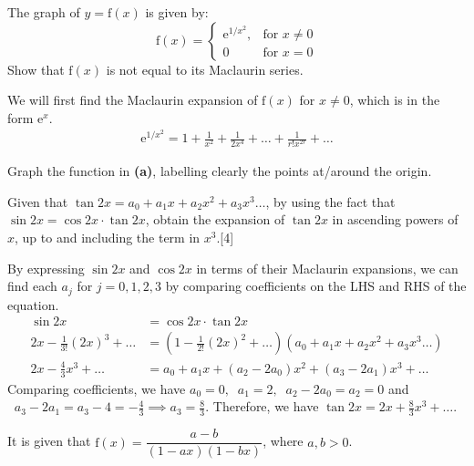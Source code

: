 \documentclass[12pt, a4 paper]{article}
\begin{document}
\begin{outline}[enumerate]
 \1 The graph of $y=\textrm{f}(x)$ is given by: %
 \begin{equation*}
  \textrm{f}(x) = \begin{cases}
   \mathrm{e}^{1/x^2}, & \textrm{for }  x\neq0 \\
   0                   & \textrm{for } x=0
  \end{cases}
 \end{equation*}
 \2 Show that \(\textrm{f}(x)\) is not equal to its Maclaurin series.
 \begin{answer}
   We will first find the Maclaurin expansion of $\textrm{f}(x)$ for $x \neq 0$, which is in the form $\mathrm{e}^x$.
   \begin{align*}
     \mathrm{e}^{1/x^2}=1+\frac{1}{x^2}+\frac{1}{2x^4}+\dots+\frac{1}{r!x^{2r}}+\dots
   \end{align*}
 \end{answer}
 \2 Graph the function in \textbf{(a)}, labelling clearly the points at/around the origin.

 \1 Given that \(\tan{2x}=a_{0}+a_{1}x+a_{2}x^2+a_{3}x^3\dots \), by using the fact that \(\sin{2x}=\cos{2x}\cdot \tan{2x}\), obtain the expansion of \(\tan{2x}\) in ascending powers of \(x\), up to and including the term in \(x^3\).\hfill[4] %
 \begin{answer}
 By expressing $\sin{2x}$ and $\cos{2x}$ in terms of their Maclaurin expansions, we can find each $a_{j}$ for $j=0,1,2,3$ by comparing coefficients on the LHS and RHS of the equation.
   \begin{align*}
     \sin{2x}&=\cos{2x}\cdot \tan{2x}\\
     2x-\frac{1}{3!}(2x)^3+\dots &= (1-\frac{1}{2!}(2x)^2+\dots)(a_{0}+a_{1}x+a_{2}x^2+a_{3}x^3\dots) \\
     2x-\frac{4}{3}x^3+\dots &= a_{0}+a_{1}x+(a_{2}-2a_{0})x^2+(a_{3}-2a_{1})x^3+\dots
   \end{align*}
   Comparing coefficients, we have $a_{0}=0,\;\; a_{1}=2,\;\; a_{2}-2a_{0}=a_{2}=0$\; and $\;\;a_{3}-2a_{1}=a_{3}-4=-\frac{4}{3}\implies a_{3}=\frac{8}{3}$. Therefore, we have $\tan{2x}=2x+\frac{8}{3}x^3+\dots$.
 \end{answer}

 \1 It is given that \(\textrm{f}(x)=\dfrac{a-b}{(1-ax)(1-bx)}\), where \(a,b>0\). %


\end{outline}
\end{document}
